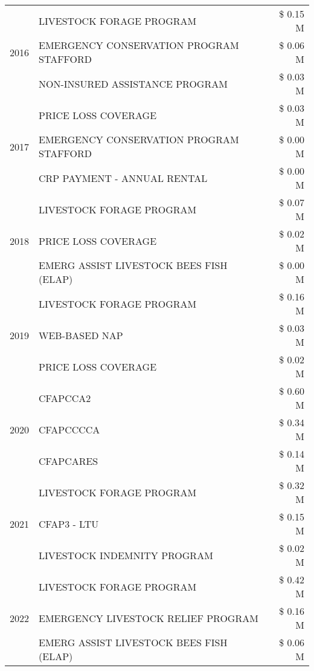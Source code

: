 \begin{tabular}{llr}
\cline{1-3}
\multirow[t]{3}{*}{2016} & LIVESTOCK FORAGE PROGRAM & \$ 0.15 M \\
 & EMERGENCY CONSERVATION PROGRAM STAFFORD & \$ 0.06 M \\
 & NON-INSURED ASSISTANCE PROGRAM & \$ 0.03 M \\
\cline{1-3}
\multirow[t]{3}{*}{2017} & PRICE LOSS COVERAGE & \$ 0.03 M \\
 & EMERGENCY CONSERVATION PROGRAM STAFFORD & \$ 0.00 M \\
 & CRP PAYMENT - ANNUAL RENTAL & \$ 0.00 M \\
\cline{1-3}
\multirow[t]{3}{*}{2018} & LIVESTOCK FORAGE PROGRAM & \$ 0.07 M \\
 & PRICE LOSS COVERAGE & \$ 0.02 M \\
 & EMERG ASSIST LIVESTOCK BEES FISH (ELAP) & \$ 0.00 M \\
\cline{1-3}
\multirow[t]{3}{*}{2019} & LIVESTOCK FORAGE PROGRAM & \$ 0.16 M \\
 & WEB-BASED NAP & \$ 0.03 M \\
 & PRICE LOSS COVERAGE & \$ 0.02 M \\
\cline{1-3}
\multirow[t]{3}{*}{2020} & CFAPCCA2 & \$ 0.60 M \\
 & CFAPCCCCA & \$ 0.34 M \\
 & CFAPCARES & \$ 0.14 M \\
\cline{1-3}
\multirow[t]{3}{*}{2021} & LIVESTOCK FORAGE PROGRAM & \$ 0.32 M \\
 & CFAP3 - LTU & \$ 0.15 M \\
 & LIVESTOCK INDEMNITY PROGRAM & \$ 0.02 M \\
\cline{1-3}
\multirow[t]{3}{*}{2022} & LIVESTOCK FORAGE PROGRAM & \$ 0.42 M \\
 & EMERGENCY LIVESTOCK RELIEF PROGRAM & \$ 0.16 M \\
 & EMERG ASSIST LIVESTOCK BEES FISH (ELAP) & \$ 0.06 M \\
\cline{1-3}
\bottomrule
\end{tabular}
